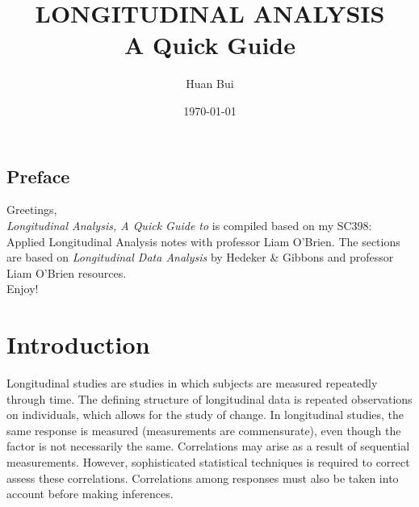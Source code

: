 \documentclass{article}
\theoremstyle{definition}
\begin{document}
	\begin{titlepage}\centering
		\clearpage
		\title{\textsc{\bf{LONGITUDINAL ANALYSIS}}\\\smallskip A Quick Guide\\}
		\author{\bigskip Huan Bui}
		\date{\today}
		\maketitle
		\thispagestyle{empty}
	\end{titlepage}

\newpage

\subsection*{Preface}

Greetings,\\

\textit{Longitudinal Analysis, A Quick Guide to} is compiled based on my SC398: Applied Longitudinal Analysis notes with professor Liam O'Brien. The sections are based on \textit{Longitudinal Data Analysis} by Hedeker \& Gibbons and professor Liam O'Brien resources. \\

Enjoy!


\newpage
\tableofcontents
\newpage

\section{Introduction}
Longitudinal studies are studies in which subjects are measured repeatedly through time. The defining structure of longitudinal data is repeated observations on individuals, which allows for the study of change. In longitudinal studies, the same response is measured (measurements are commensurate), even though the factor is not necessarily the same. Correlations may arise as a result of sequential measurements. However, sophisticated statistical techniques is required to correct assess these correlations. Correlations among responses must also be taken into account before making inferences. 
\end{document}

